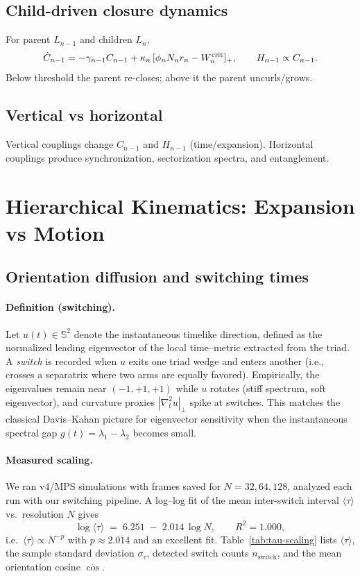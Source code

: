 \documentclass[11pt]{article}
\begin{document}
\subsection{Child-driven closure dynamics}
For parent $L_{n-1}$ and children $L_n$,
\begin{equation}
\dot C_{n-1}=-\gamma_{n-1}C_{n-1}+\kappa_n\,[\phi_n N_n r_n- W^{\rm crit}_n]_+,\qquad
H_{n-1}\propto C_{n-1}.
\end{equation}
Below threshold the parent re-closes; above it the parent uncurls/grows.

\subsection{Vertical vs horizontal}
Vertical couplings change $C_{n-1}$ and $H_{n-1}$ (time/expansion). Horizontal couplings produce synchronization, sectorization spectra, and entanglement.

\section{Hierarchical Kinematics: Expansion vs Motion}

\subsection{Orientation diffusion and switching times}
\label{subsec:switch-scaling}

\paragraph{Definition (switching).}
Let $u(t)\in\mathbb{S}^{2}$ denote the instantaneous timelike direction, defined as the normalized leading eigenvector of the local time–metric extracted from the triad.
A \emph{switch} is recorded when $u$ exits one triad wedge and enters another (i.e., crosses a separatrix where two arms are equally favored).
Empirically, the eigenvalues remain near $(-1,+1,+1)$ while $u$ rotates (stiff spectrum, soft eigenvector), and curvature proxies $|\nabla_t^2 u|_\perp$ spike at switches. This matches the classical Davis–Kahan picture for eigenvector sensitivity when the instantaneous spectral gap $g(t)=\lambda_1-\lambda_2$ becomes small.

\paragraph{Measured scaling.}
We ran v4/MPS simulations with frames saved for $N=32,64,128$, analyzed each run with our switching pipeline. A log–log fit of the mean inter-switch interval $\langle\tau\rangle$ vs.\ resolution $N$ gives
\begin{equation}
\log \langle\tau\rangle \;=\; 6.251 \;-\; 2.014\,\log N, \qquad R^2 = 1.000,
\end{equation}
i.e.\ $\langle\tau\rangle \propto N^{-p}$ with $p \approx 2.014$ and an excellent fit.
Table~\ref{tab:tau-scaling} lists $\langle\tau\rangle$, the sample standard deviation $\sigma_\tau$, detected switch counts $n_{\mathrm{switch}}$, and the mean orientation cosine $\overline{\cos}$.
\medskip
\end{document}
